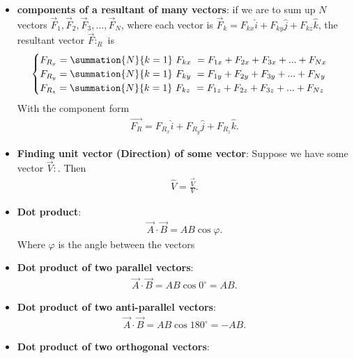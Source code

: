 \documentclass{report}
\begin{document}
\begin{itemize}
    \item \textbf{components of a resultant of many vectors}: if we are to sum up $N$ vectors $\vec{F}_1, \vec{F}_2, \vec{F}_3, \ldots, \vec{F}_N$, where each vector is $\vec{F}_k = F_{kx}\hat{i} + F_{ky}\hat{j} + F_{kz}\hat{k}$, the resultant vector $\vec{F}:_R$ is
           \begin{equation}
                \begin{cases}
                    F_{R_{x}} = \summation{N}{k=1}\ F_{kx}\ = F_{1x} + F_{2x} + F_{3x} + ... + F_{Nx} \\
                    F_{R_{y}} = \summation{N}{k=1}\ F_{ky}\ = F_{1y} + F_{2y} + F_{3y} + ... + F_{Ny} \\
                    F_{R_{z}} = \summation{N}{k=1}\ F_{kz}\ = F_{1z} + F_{2z} + F_{3z} + ... + F_{Nz} \\
                \end{cases}
            \end{equation}
        With the component form 
        \begin{align*}
            \vec{F_{R}} = F_{R_{x}}\hat{i} + F_{R_{y}}\hat{j} + F_{R_{z}}\hat{k}
        .\end{align*}
    \item \textbf{Finding unit vector (Direction) of some vector}: Suppose we have some vector $\vec{V}:$. Then 
        \begin{align*}
            \hat{V} = \frac{\vec{V}}{V}
        .\end{align*}
    \item \textbf{Dot product}:
        \begin{align*}
            \vec{A} \cdot \vec{B} = AB\cos{\varphi} 
        .\end{align*}
        Where $\varphi$ is the angle between the vectors
    \item \textbf{Dot product of two parallel vectors}:
        \begin{align*}
            \vec{A} \cdot \vec{B} = AB\cos{0^{\circ}} = AB
        .\end{align*}
    \item \textbf{Dot product of two anti-parallel vectors}:
        \begin{align*}
            \vec{A} \cdot \vec{B} = AB\cos{180^{\circ}} = -AB
        .\end{align*}
    \item \textbf{Dot product of two orthogonal vectors}:
        \begin{align*}

\end{align*}
\end{itemize}
\end{document}
